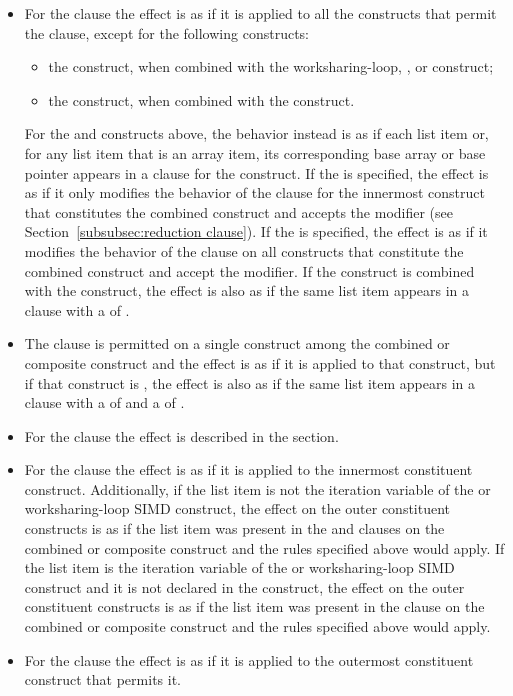 \begin{itemize}
\item For the  clause the effect is as if it is applied to all the constructs that permit
the clause, except for the following constructs:
\begin{itemize}
\item the  construct, when combined with the
    worksharing-loop, , or  construct;
\item the  construct,  when combined with the  construct.
\end{itemize}
For the  and  constructs above, the behavior
instead is as if each list item or, for any list item that is an array item, its corresponding
base array or base pointer appears in a  clause for the construct.
If the   is specified, the effect is as if it only modifies
the behavior of the  clause for the innermost construct that
constitutes the combined construct and accepts the modifier (see
Section~\ref{subsubsec:reduction clause}). If the 
 is specified, the effect is as if it modifies the
behavior of the  clause on all constructs that constitute
the combined construct and accept the modifier.  If the construct is combined with
the  construct, the effect is also as if the same list item
appears in a  clause with a  of .

\item The  clause is permitted on a single construct
among the combined or composite construct and the effect is as if it is
applied to that construct, but if that construct is , the
effect is also as if the same list item appears in a  clause with
a  of  and a  of
.

\item For the  clause the effect is described in the  section.

\item For the  clause the effect is as if it is applied to the innermost
constituent construct.
Additionally, if the list item is not the iteration variable of the
 or worksharing-loop SIMD
construct, the effect on the outer constituent constructs is as if the list item was present
in the  and  clauses on the combined or
composite construct and the rules specified above would apply.  If the list item is the
iteration variable of the  or worksharing-loop SIMD construct and it is not declared in the construct,
the effect on the outer constituent constructs is as if the list item was present in the
 clause on the combined or composite construct and the rules specified above
would apply.

\item For the  clause the effect is as if it is applied to the
outermost constituent construct that permits it.

\end{itemize}

